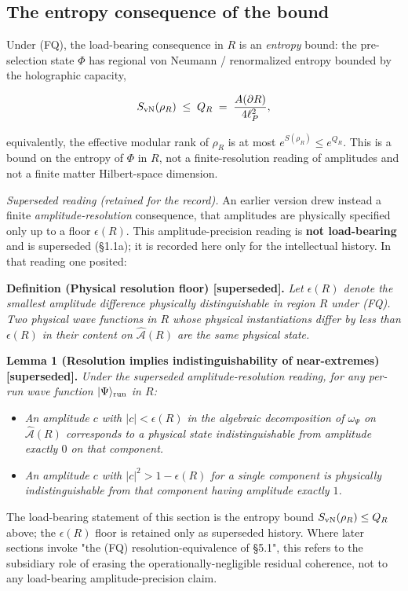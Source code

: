 \documentclass[11pt,a4paper]{article}
\begin{document}
\subsection{The entropy consequence of the bound}

Under (FQ), the load-bearing consequence in $R$ is an \emph{entropy} bound: the pre-selection state $\Phi$ has regional von Neumann / renormalized entropy bounded by the holographic capacity,

\[
S_{\rm vN}(\rho_R) \;\le\; Q_R \;=\; \frac{A(\partial R)}{4\ell_P^2},
\]

equivalently, the effective modular rank of $\rho_R$ is at most $e^{S(\rho_R)} \le e^{Q_R}$. This is a bound on the entropy of $\Phi$ in $R$, not a finite-resolution reading of amplitudes and not a finite matter Hilbert-space dimension.

\emph{Superseded reading (retained for the record).} An earlier version drew instead a finite \emph{amplitude-resolution} consequence, that amplitudes are physically specified only up to a floor $\epsilon(R)$. This amplitude-precision reading is \textbf{not load-bearing} and is superseded (§1.1a); it is recorded here only for the intellectual history. In that reading one posited:

\textbf{Definition (Physical resolution floor) [superseded].} \emph{Let $\epsilon(R)$ denote the smallest amplitude difference physically distinguishable in region $R$ under (FQ). Two physical wave functions in $R$ whose physical instantiations differ by less than $\epsilon(R)$ in their content on $\hat{\mathcal{A}}(R)$ are the same physical state.}

\textbf{Lemma 1 (Resolution implies indistinguishability of near-extremes) [superseded].} \emph{Under the superseded amplitude-resolution reading, for any per-run wave function $|\Psi\rangle_{\rm run}$ in $R$:}
\begin{itemize}
  \item \emph{An amplitude $c$ with $|c| < \epsilon(R)$ in the algebraic decomposition of $\omega_\Psi$ on $\hat{\mathcal{A}}(R)$ corresponds to a physical state indistinguishable from amplitude exactly $0$ on that component.}
  \item \emph{An amplitude $c$ with $|c|^2 > 1 - \epsilon(R)$ for a single component is physically indistinguishable from that component having amplitude exactly $1$.}
\end{itemize}

The load-bearing statement of this section is the entropy bound $S_{\rm vN}(\rho_R) \le Q_R$ above; the $\epsilon(R)$ floor is retained only as superseded history. Where later sections invoke "the (FQ) resolution-equivalence of §5.1", this refers to the subsidiary role of erasing the operationally-negligible residual coherence, not to any load-bearing amplitude-precision claim.
\end{document}
